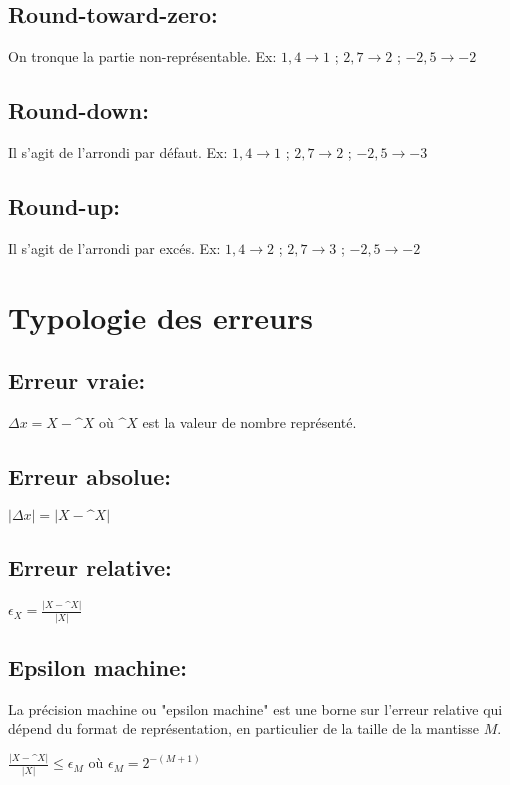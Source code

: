 \documentclass[11pt]{article}
\begin{document}
\subsection{Round-toward-zero:}
On tronque la partie non-représentable. Ex: $1,4 \rightarrow 1$ ; $2,7 \rightarrow 2$ ; $-2,5 \rightarrow -2$

\subsection{Round-down:}
Il s'agit de l'arrondi par défaut. Ex: $1,4 \rightarrow 1$ ; $2,7 \rightarrow 2$ ; $-2,5 \rightarrow -3$

\subsection{Round-up:}
Il s'agit de l'arrondi par excés. Ex: $1,4 \rightarrow 2$ ; $2,7 \rightarrow 3$ ; $-2,5 \rightarrow -2$

\newpage

\section{Typologie des erreurs}

\subsection{Erreur vraie:}
$\Delta x = X - \^X$ où $\^X$ est la valeur de nombre représenté.

\subsection{Erreur absolue:}
$|\Delta x| = |X - \^X|$

\subsection{Erreur relative:}
$\epsilon_X = \frac{|X-\^X|}{|X|}$ \\

\subsection{Epsilon machine:}
La précision machine ou "epsilon machine" est une borne sur l'erreur relative qui 
dépend du format de représentation, en particulier de la taille de la mantisse $M$. \\
\begin{center}
    $\frac{|X-\^X|}{|X|} \leq \epsilon_M$ où $\epsilon_M = 2^{-(M+1)}$
\end{center}
\end{document}
